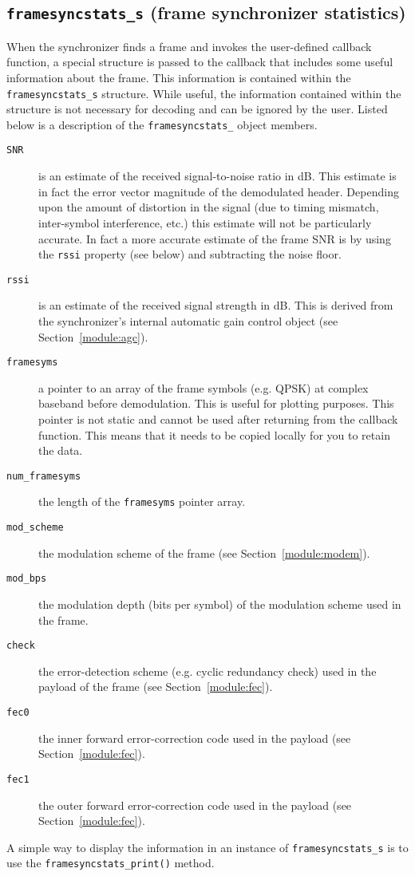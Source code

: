 \subsection{{\tt framesyncstats\_s} (frame synchronizer statistics)}
\label{module:framing:framesyncstats_s}
When the synchronizer finds a frame and invokes the user-defined
callback function, a special structure is passed to the callback that
includes some useful information about the frame.
This information is contained within the {\tt framesyncstats\_s}
structure.
While useful, the information contained within the structure is not
necessary for decoding and can be ignored by the user.
Listed below is a description of the {\tt framesyncstats\_} object
members.
%
\begin{description}
\item[{\tt SNR}]
    is an estimate of the received signal-to-noise ratio in dB.
    This estimate is in fact the error vector magnitude of the
    demodulated header.
    Depending upon the amount of distortion in the signal
    (due to timing mismatch, inter-symbol interference, etc.)
    this estimate will not be particularly accurate.
    In fact a more accurate estimate of the frame SNR is by using the
    {\tt rssi} property (see below) and subtracting the noise floor.
\item[{\tt rssi}]
    is an estimate of the received signal strength in dB.
    This is derived from the synchronizer's internal automatic gain
    control object (see Section~\ref{module:agc}).
\item[{\tt framesyms}]
    a pointer to an array of the frame symbols (e.g. QPSK) at complex
    baseband before demodulation.
    This is useful for plotting purposes.
    This pointer is not static and cannot be used after returning from
    the callback function.
    This means that it needs to be copied locally for you to retain the
    data.
\item[{\tt num\_framesyms}]
    the length of the {\tt framesyms} pointer array.
\item[{\tt mod\_scheme}]
    the modulation scheme of the frame (see Section~\ref{module:modem}).
\item[{\tt mod\_bps}]
    the modulation depth (bits per symbol) of the modulation scheme used
    in the frame.
\item[{\tt check}]
    the error-detection scheme (e.g. cyclic redundancy check)
    used in the payload of the frame (see Section~\ref{module:fec}).
\item[{\tt fec0}]
    the inner forward error-correction code used in the payload
    (see Section~\ref{module:fec}).
\item[{\tt fec1}]
    the outer forward error-correction code used in the payload
    (see Section~\ref{module:fec}).
\end{description}
%
A simple way to display the information in an instance of
{\tt framesyncstats\_s} is to use the {\tt framesyncstats\_print()}
method.


